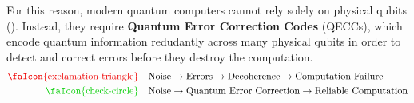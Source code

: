 \highspace
For this reason, modern quantum computers cannot rely solely on physical qubits (). Instead, they require \textbf{Quantum Error Correction Codes} (QECCs), which encode quantum information redudantly across many physical qubits in order to detect and correct errors before they destroy the computation.
\begin{align*}
    \text{\textcolor{Red2}{\faIcon{exclamation-triangle}}} \hspace{1em} & \text{Noise} \to \text{Errors} \to \text{Decoherence} \to \text{Computation Failure} \\
    \text{\textcolor{Green3}{\faIcon{check-circle}}}       \hspace{1em} & \text{Noise} \to \text{Quantum Error Correction} \to \text{Reliable Computation}
\end{align*}
